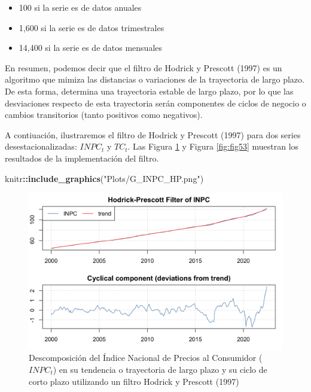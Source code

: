 \documentclass[
]{book}
\newenvironment{Shaded}{\begin{snugshade}}{\end{snugshade}}
\newcommand{\FunctionTok}[1]{\textcolor[rgb]{0.13,0.29,0.53}{\textbf{#1}}}
\newcommand{\NormalTok}[1]{#1}
\newcommand{\SpecialCharTok}[1]{\textcolor[rgb]{0.81,0.36,0.00}{\textbf{#1}}}
\newcommand{\StringTok}[1]{\textcolor[rgb]{0.31,0.60,0.02}{#1}}
\begin{document}
\begin{itemize}
    \item 100 si la serie es de datos anuales
    \item 1,600 si la serie es de datos trimestrales
    \item 14,400 si la serie es de datos mensuales
\end{itemize}

En resumen, podemos decir que el filtro de Hodrick y Prescott (1997) es un algoritmo que mimiza las distancias o variaciones de la trayectoria de largo plazo. De esta forma, determina una trayectoria estable de largo plazo, por lo que las desviaciones respecto de esta trayectoria serán componentes de ciclos de negocio o cambios transitorios (tanto positivos como negativos).

A contiuación, ilustraremos el filtro de Hodrick y Prescott (1997) para dos series desestacionalizadas: \(INPC_t\) y \(TC_t\). Las Figura \ref{fig:fig52} y Figura \ref{fig:fig53} muestran los resultados de la implementación del filtro.

\begin{Shaded}
\begin{Highlighting}[]
\NormalTok{knitr}\SpecialCharTok{::}\FunctionTok{include\_graphics}\NormalTok{(}\StringTok{"Plots/G\_INPC\_HP.png"}\NormalTok{) }
\end{Highlighting}
\end{Shaded}

\begin{figure}

{\centering \includegraphics[width=0.95\linewidth]{Plots/G_INPC_HP} 

}

\caption{Descomposición del Índice Nacional de Precios al Consumidor ($INPC_t$) en su tendencia o trayectoria de largo plazo y su ciclo de corto plazo utilizando un filtro Hodrick y Prescott (1997)}\label{fig:fig52}
\end{figure}
\end{document}
